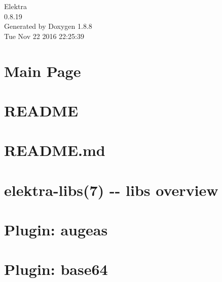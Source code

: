\documentclass[twoside]{book}
\newcommand{\+}{\discretionary{\mbox{\scriptsize$\hookleftarrow$}}{}{}}
\newcommand{\clearemptydoublepage}{%
  \newpage{\pagestyle{empty}\cleardoublepage}%
}
\begin{document}
\hypersetup{pageanchor=false,
             bookmarks=true,
             bookmarksnumbered=true,
             pdfencoding=unicode
            }
\begin{titlepage}
\vspace*{7cm}
\begin{center}%
{\Large Elektra \\[1ex]\large 0.\+8.\+19 }\\
\vspace*{1cm}
{\large Generated by Doxygen 1.8.8}\\
\vspace*{0.5cm}
{\small Tue Nov 22 2016 22:25:39}\\
\end{center}
\end{titlepage}
\clearemptydoublepage
\tableofcontents
\clearemptydoublepage
{}
\hypersetup{pageanchor=true}

\chapter{Main Page}
\label{index}\hypertarget{index}{}
\chapter{R\+E\+A\+D\+M\+E}
\label{md_src_libs_elektra_README}
\hypertarget{md_src_libs_elektra_README}{}

\chapter{R\+E\+A\+D\+M\+E.\+md}
\label{src_libs_getenv_README_md}
\hypertarget{src_libs_getenv_README_md}{}

\chapter{elektra-\/libs(7) -\/-\/ libs overview}
\label{md_src_libs_README}
\hypertarget{md_src_libs_README}{}

\chapter{Plugin\+: augeas}
\label{md_src_plugins_augeas_README}
\hypertarget{md_src_plugins_augeas_README}{}

\chapter{Plugin\+: base64}
\label{md_src_plugins_base64_README}
\hypertarget{md_src_plugins_base64_README}{}

\end{document}
